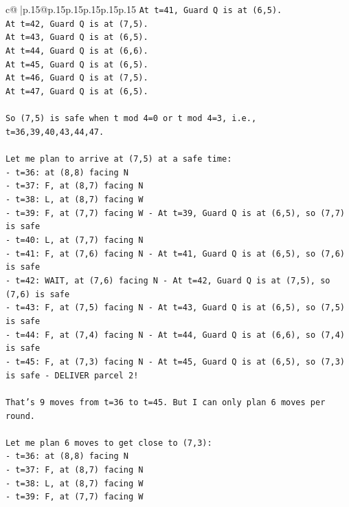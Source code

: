 \documentclass{article}
\begin{document}
{\begin{supertabular}{c@{$\;$}|p{.15\linewidth}@{}p{.15\linewidth}p{.15\linewidth}p{.15\linewidth}p{.15\linewidth}p{.15\linewidth}}
{{{\texttt{At t=41, Guard Q is at (6,5).} \\
\texttt{At t=42, Guard Q is at (7,5).} \\
\texttt{At t=43, Guard Q is at (6,5).} \\
\texttt{At t=44, Guard Q is at (6,6).} \\
\texttt{At t=45, Guard Q is at (6,5).} \\
\texttt{At t=46, Guard Q is at (7,5).} \\
\texttt{At t=47, Guard Q is at (6,5).} \\
\\ 
\texttt{So (7,5) is safe when t mod 4=0 or t mod 4=3, i.e., t=36,39,40,43,44,47.} \\
\\ 
\texttt{Let me plan to arrive at (7,5) at a safe time:} \\
\texttt{{-} t=36: at (8,8) facing N} \\
\texttt{{-} t=37: F, at (8,7) facing N} \\
\texttt{{-} t=38: L, at (8,7) facing W} \\
\texttt{{-} t=39: F, at (7,7) facing W {-} At t=39, Guard Q is at (6,5), so (7,7) is safe} \\
\texttt{{-} t=40: L, at (7,7) facing N} \\
\texttt{{-} t=41: F, at (7,6) facing N {-} At t=41, Guard Q is at (6,5), so (7,6) is safe} \\
\texttt{{-} t=42: WAIT, at (7,6) facing N {-} At t=42, Guard Q is at (7,5), so (7,6) is safe} \\
\texttt{{-} t=43: F, at (7,5) facing N {-} At t=43, Guard Q is at (6,5), so (7,5) is safe} \\
\texttt{{-} t=44: F, at (7,4) facing N {-} At t=44, Guard Q is at (6,6), so (7,4) is safe} \\
\texttt{{-} t=45: F, at (7,3) facing N {-} At t=45, Guard Q is at (6,5), so (7,3) is safe {-} DELIVER parcel 2!} \\
\\ 
\texttt{That's 9 moves from t=36 to t=45. But I can only plan 6 moves per round.} \\
\\ 
\texttt{Let me plan 6 moves to get close to (7,3):} \\
\texttt{{-} t=36: at (8,8) facing N} \\
\texttt{{-} t=37: F, at (8,7) facing N} \\
\texttt{{-} t=38: L, at (8,7) facing W} \\
\texttt{{-} t=39: F, at (7,7) facing W} \\
}}}
\end{supertabular}}
\end{document}
